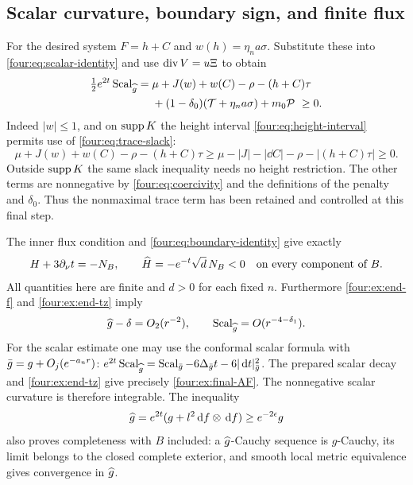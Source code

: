 \subsection{Scalar curvature, boundary sign, and finite flux}

For the desired system $F=h+C$ and
$w(h)=\eta_n a\sigma$.  Substitute these into
\eqref{four:eq:scalar-identity} and use $\operatorname{div} V=u\Xi$ to obtain
\begin{equation}\label{four:ex:positive-scalar}
 \begin{split}
 \tfrac12e^{2t}\operatorname{Scal}_{\widehat g}
 ={}&\mu+J(w)+w(C)-\rho-(h+C)\tau\\
 &+(1-\delta_0)(\mathcal T+\eta_n a\sigma)+m_0\mathcal P\ \ge0.
 \end{split}
\end{equation}
Indeed $|w|\le1$, and on $\operatorname{supp} K$ the height interval
\eqref{four:eq:height-interval} permits use of \eqref{four:eq:trace-slack}:
\[
 \mu+J(w)+w(C)-\rho-(h+C)\tau
 \ge\mu-|J|-|\dd C|-\rho-|(h+C)\tau|\ge0.
\]
Outside $\operatorname{supp} K$ the same slack inequality needs no height restriction.
The other terms are nonnegative by \eqref{four:eq:coercivity} and the
definitions of the penalty and $\delta_0$.  Thus the nonmaximal trace
term has been retained and controlled at this final step.

The inner flux condition and \eqref{four:eq:boundary-identity} give exactly
\begin{equation}\label{four:ex:negative-boundary}
 H+3\partial_\nu t=-N_B,
 \qquad \widehat H=-e^{-t}\sqrt d\,N_B<0
 \quad\hbox{on every component of }B.
\end{equation}
All quantities here are finite and $d>0$ for each fixed $n$.
Furthermore \eqref{four:ex:end-f} and \eqref{four:ex:end-tz} imply
\begin{equation}\label{four:ex:final-AF}
 \widehat g-\delta=O_2(r^{-2}),\qquad
 \operatorname{Scal}_{\widehat g}=O(r^{-4-\delta_1}).
\end{equation}
For the scalar estimate one may use the conformal scalar formula
with $\bar g=g+O_j(e^{-a_nr})$:
$e^{2t}\operatorname{Scal}_{\widehat g}=\operatorname{Scal}_{\bar g}-6\Delta_{\bar g}t
-6|\,\mathrm d t|_{\bar g}^2$.  The prepared scalar decay and
\eqref{four:ex:end-tz} give precisely \eqref{four:ex:final-AF}.
The nonnegative scalar curvature is therefore integrable.
The inequality
\begin{equation}\label{four:ex:metric-comparison}
 \widehat g=e^{2t}(g+l^2\,\mathrm d f\otimes\,\mathrm d f)\ge e^{-2\epsilon}g
\end{equation}
also proves completeness with $B$ included: a $\widehat g$-Cauchy sequence
is $g$-Cauchy, its limit belongs to the closed complete exterior, and
smooth local metric equivalence gives convergence in $\widehat g$.

